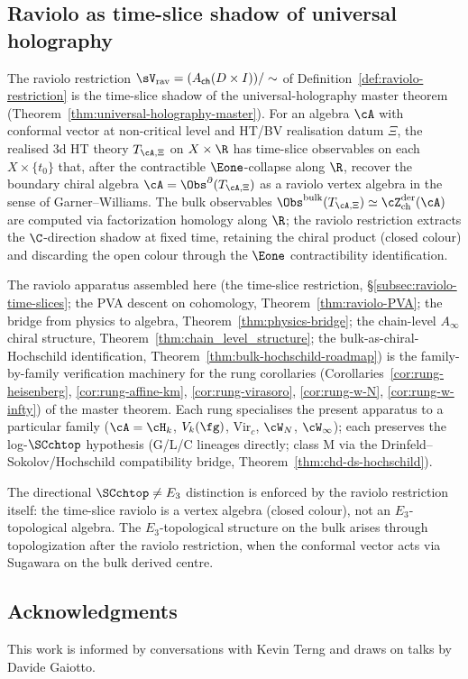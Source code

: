 \subsection{Raviolo as time-slice shadow of universal holography}
\label{subsec:raviolo-holography-anchor}

\begin{remark}
\label{rem:raviolo-holography-anchor}%
%
The raviolo restriction
$\sV_{\mathrm{rav}} = (A_{\mathsf{ch}}(D \times I)) / \sim$
of Definition~\ref{def:raviolo-restriction} is the time-slice
shadow of the universal-holography master theorem
(Theorem~\ref{thm:universal-holography-master}). For an algebra
$\cA$ with conformal vector at non-critical level and HT/BV
realisation datum $\Xi$, the realised
3d HT theory $T_{\cA,\Xi}$ on $X \times \R$ has time-slice observables
on each $X \times \{t_0\}$ that, after the contractible
$\Eone$-collapse along $\R$, recover the boundary chiral algebra
$\cA = \Obs^\partial(T_{\cA,\Xi})$ as a raviolo vertex algebra in the
sense of Garner--Williams. The bulk observables
$\Obs^{\mathrm{bulk}}(T_{\cA,\Xi}) \simeq \cZ^{\mathrm{der}}_{\mathrm{ch}}(\cA)$
are computed via factorization homology along $\R$; the raviolo
restriction extracts the $\C$-direction shadow at fixed time,
retaining the chiral product (closed colour) and discarding the
open colour through the $\Eone$ contractibility identification.

The raviolo apparatus assembled here (the time-slice
restriction, \S\ref{subsec:raviolo-time-slices}; the PVA descent
on cohomology, Theorem~\ref{thm:raviolo-PVA}; the bridge from
physics to algebra, Theorem~\ref{thm:physics-bridge}; the
chain-level $A_\infty$ chiral structure,
Theorem~\ref{thm:chain_level_structure}; the bulk-as-chiral-Hochschild
identification, Theorem~\ref{thm:bulk-hochschild-roadmap}) is
the family-by-family verification machinery for the rung corollaries
(Corollaries~\ref{cor:rung-heisenberg}, \ref{cor:rung-affine-km},
\ref{cor:rung-virasoro}, \ref{cor:rung-w-N}, \ref{cor:rung-w-infty})
of the master theorem. Each rung specialises the present apparatus
to a particular family ($\cA = \cH_k$, $V_k(\fg)$, $\mathrm{Vir}_c$,
$\cW_N$, $\cW_\infty$); each preserves the log-$\SCchtop$
hypothesis (G/L/C lineages directly; class M via the
Drinfeld--Sokolov/Hochschild compatibility bridge,
Theorem~\ref{thm:chd-ds-hochschild}).

The directional $\SCchtop \neq E_3$ distinction is enforced by the
raviolo restriction itself: the time-slice raviolo is a vertex
algebra (closed colour), not an $E_3$-topological algebra. The
$E_3$-topological structure on the bulk arises through topologization
after the raviolo restriction, when the conformal vector
acts via Sugawara on the bulk derived centre.
\end{remark}

\subsection{Acknowledgments}

This work is informed by conversations with Kevin Terng and draws on talks by Davide Gaiotto.
